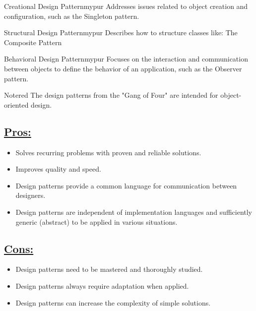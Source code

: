 \begin{prettyBox}{Creational Design Pattern}{mypur}
Addresses issues related to object creation and configuration, such as the Singleton pattern.
\end{prettyBox}

\vspace{0.25cm}
\begin{prettyBox}{Structural Design Pattern}{mypur}
Describes how to structure classes like: The Composite Pattern
\end{prettyBox}


\vspace{0.25cm}

\begin{prettyBox}{Behavioral Design Pattern}{mypur}
Focuses on the interaction and communication between objects to define
the behavior of an application, such as the Observer pattern.
\end{prettyBox}


\vspace{0.25cm}
\begin{prettyBox}{Note}{red}
The design patterns from the "Gang of Four" are intended for
object-oriented design.
\end{prettyBox}

\vspace{0.25cm}

\subsection*{\underline{Pros:}}
\begin{itemize}
    \item Solves recurring problems with proven and reliable solutions.
    \item Improves quality and speed.
    \item Design patterns provide a common language for communication between designers.
    \item Design patterns are independent of implementation languages and sufficiently generic (abstract) to be applied in various situations.
\end{itemize}

\vspace{0.25cm}

\subsection*{\underline{Cons:}}
\begin{itemize}
    \item Design patterns need to be mastered and thoroughly studied.
    \item Design patterns always require adaptation when applied.
    \item Design patterns can increase the complexity of simple solutions.
\end{itemize}

